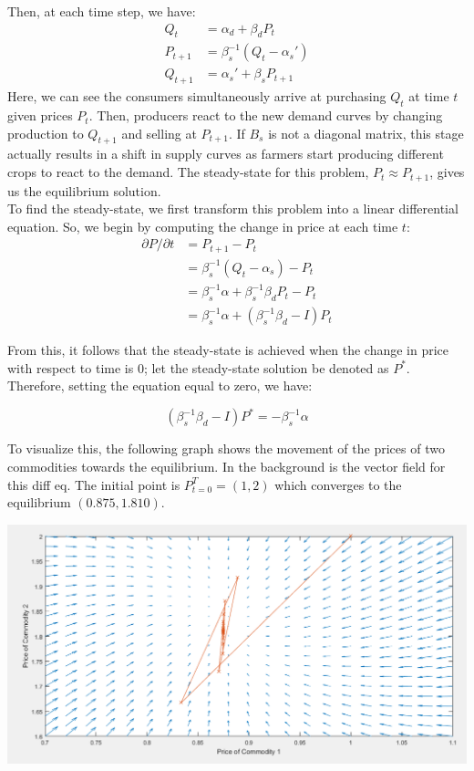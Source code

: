 \documentclass[12pt]{article}
\begin{document}
Then, at each time step, we have:
\begin{align*}
Q_{t} &= \alpha_d + \beta_d P_t \\
P_{t+1}& = \beta_s^{-1} (Q_{t} - \alpha_s') \\
Q_{t+1} &= \alpha_s' + \beta_s P_{t+1}
\end{align*}
Here, we can see the consumers simultaneously arrive at purchasing $Q_t$ at time $t$ given prices $P_t$. Then, producers react to the new demand curves by changing production to $Q_{t+1}$ and selling at $P_{t+1}$. If $B_s$ is not a diagonal matrix, this stage actually results in a shift in supply curves as farmers start producing different crops to react to the demand. The steady-state for this problem, $P_t \approx P_{t+1}$, gives us the equilibrium solution. \\

To find the steady-state, we first transform this problem into a linear differential equation. So, we begin by computing the change in price at each time $t$:
\begin{align*}
{\partial P}/{\partial t} &= P_{t+1} - P_t 		     \\
&= \beta_s^{-1} (Q_{t} - \alpha_s) - P_t				 \\
&= \beta_s^{-1} \alpha  + \beta_s^{-1} \beta_d P_t - P_t \\
&= \beta_s^{-1} \alpha  + (\beta_s^{-1} \beta_d - I) P_t
\end{align*}

From this, it follows that the steady-state is achieved when the change in price with respect to time is 0; let the steady-state solution be denoted as $P^*$. Therefore, setting the equation equal to zero, we have:

$$(\beta_s^{-1} \beta_d - I) P^* = -\beta_s^{-1} \alpha$$

To visualize this, the following graph shows the movement of the prices of two commodities towards the equilibrium. In the background is the vector field for this diff eq. The initial point is $P_{t=0}^T = (1,2)$ which converges to the equilibrium $(0.875,1.810)$.

\begin{center}
	\includegraphics[scale = 0.5]{figures/vector_field}
\end{center}
\end{document}
